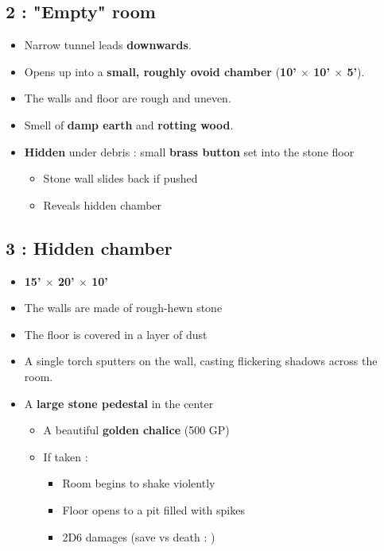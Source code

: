 \subsection{2 : "Empty" room}\label{l1:r2}
\begin{itemize}
  \item Narrow tunnel leads \textbf{downwards}.
  \item Opens up into a \textbf{small, roughly ovoid chamber} (\textbf{10' $\times$ 10' $\times$ 5'}).
  \item The walls and floor are rough and uneven.
  \item Smell of \textbf{damp earth} and \textbf{rotting wood}.
  \item \textbf{Hidden} under debris : small \textbf{brass button} set into the stone floor
  \begin{itemize}
    \item Stone wall slides back if pushed
    \item Reveals hidden chamber
  \end{itemize}
\end{itemize}

\subsection{3 : Hidden chamber}\label{l1:r3}
\begin{itemize}
  \item \textbf{15' $\times$ 20' $\times$ 10'}
  \item The walls are made of rough-hewn stone
  \item The floor is covered in a layer of dust
  \item A single torch sputters on the wall, casting flickering shadows across the room.
  \item A \textbf{large stone pedestal} in the center
  \begin{itemize}
    \item A beautiful \textbf{golden chalice} (500 GP)
    \item If taken :
    \begin{itemize}
      \item Room begins to shake violently
      \item Floor opens to a pit filled with spikes
      \item 2D6 damages (save vs death : \textonehalf)
    \end{itemize}
  \end{itemize}
\end{itemize}

